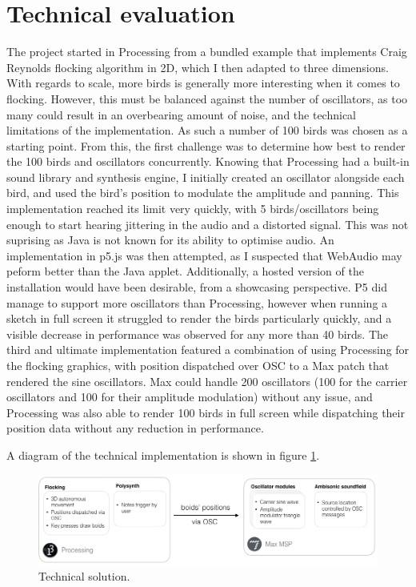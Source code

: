 \documentclass[journal, a4paper]{IEEEtran}
\begin{document}
\section*{Technical evaluation}
The project started in Processing from a bundled example that implements Craig Reynolds flocking algorithm \cite{reynolds} in 2D, which I then adapted to three dimensions. With regards to scale, more birds is generally more interesting when it comes to flocking. However, this must be balanced against the number of oscillators, as too many could result in an overbearing amount of noise, and the technical limitations of the implementation. As such a number of 100 birds was chosen as a starting point. From this, the first challenge was to determine how best to render the 100 birds and oscillators concurrently. Knowing that Processing had a built-in sound library and synthesis engine, I initially created an oscillator alongside each bird, and used the bird's position to modulate the amplitude and panning. This implementation reached its limit very quickly, with 5 birds/oscillators being enough to start hearing jittering in the audio and a distorted signal. This was not suprising as Java is not known for its ability to optimise audio.
An implementation in p5.js was then attempted, as I suspected that WebAudio may peform better than the Java applet. Additionally, a hosted version of the installation would have been desirable, from a showcasing perspective. P5 did manage to support more oscillators than Processing, however when running a sketch in full screen it struggled to render the birds particularly quickly, and a visible decrease in performance was observed for any more than 40 birds. The third and ultimate implementation featured a combination of using Processing for the flocking graphics, with position dispatched over OSC to a Max patch that rendered the sine oscillators. Max could handle 200 oscillators (100 for the carrier oscillators and 100 for their amplitude modulation) without any issue, and Processing was also able to render 100 birds in full screen while dispatching their position data without any reduction in performance.

A diagram of the technical implementation is shown in figure \ref{fig:tech}.

\begin{figure}[hbt!]
    \centering
    \includegraphics[width=\columnwidth]{tech_diag.jpeg}
    \caption{Technical solution.}
    \label{fig:tech}
\end{figure}
\end{document}
